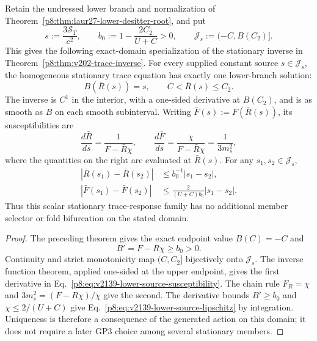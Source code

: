 \documentclass[12pt,a4paper]{article}
\begin{document}
\begin{theorem}
\label{p8:thm:v2139-lower-stationary-source-response}
Retain the undressed lower branch and normalization of
Theorem~\ref{p8:thm:laur27-lower-desitter-root}, and put
\[
 s:=\frac{3\mathcal S_T}{c^2},\qquad
 b_0:=1-\frac{2C_2}{U+C}>0,\qquad
 \mathcal J_s:=(-C,B(C_2)].
\]
This gives the following exact-domain specialization of the stationary inverse
in Theorem~\ref{p8:thm:v202-trace-inverse}.  For every supplied constant
source $s\in\mathcal J_s$, the homogeneous stationary trace equation has
exactly one lower-branch solution:
\begin{equation}
\label{p8:eq:v2139-lower-stationary-inverse}
 \boxed{B(\bar R(s))=s,\qquad C<\bar R(s)\le C_2.}
\end{equation}
The inverse is $C^1$ in the interior, with a one-sided derivative at $B(C_2)$,
and is as smooth as $B$ on each smooth subinterval.  Writing
$\bar F(s):=F(\bar R(s))$, its susceptibilities are
\begin{equation}
\label{p8:eq:v2139-lower-source-susceptibility}
 \boxed{
 \frac{d\bar R}{ds}=\frac1{F-\bar R\chi},\qquad
 \frac{d\bar F}{ds}=\frac{\chi}{F-\bar R\chi}
                  =\frac1{3m_s^2},}
\end{equation}
where the quantities on the right are evaluated at $\bar R(s)$.  For any
$s_1,s_2\in\mathcal J_s$,
\begin{align}
\label{p8:eq:v2139-lower-source-lipschitz}
 |\bar R(s_1)-\bar R(s_2)|&\le b_0^{-1}|s_1-s_2|,\\
 |\bar F(s_1)-\bar F(s_2)|&\le
 \frac{2}{(U+C)b_0}|s_1-s_2|.\nonumber
\end{align}
Thus this scalar stationary trace-response family has no additional
member selector or fold bifurcation on the stated domain.
\end{theorem}
\begin{proof}
The preceding theorem gives the exact endpoint value $B(C)=-C$ and
\[
 B'=F-R\chi\ge b_0>0.
\]
Continuity and strict monotonicity map $(C,C_2]$ bijectively onto
$\mathcal J_s$.  The inverse function theorem, applied one-sided at the upper
endpoint, gives the first derivative in
Eq.~\eqref{p8:eq:v2139-lower-source-susceptibility}.  The chain rule
$F_R=\chi$ and $3m_s^2=(F-R\chi)/\chi$ give the second.  The derivative
bounds $B'\ge b_0$ and $\chi\le2/(U+C)$ give
Eq.~\eqref{p8:eq:v2139-lower-source-lipschitz} by integration.  Uniqueness is
therefore a consequence of the generated action on this domain; it does not
require a later GP3 choice among several stationary members.
\end{proof}
\end{document}
